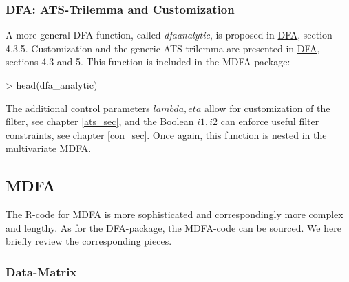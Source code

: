 \documentclass[a4paper]{book}
\begin{document}
\subsubsection{DFA: ATS-Trilemma and Customization}

A more general DFA-function, called \emph{dfa\textunderscore analytic}, is proposed in \href{http://blog.zhaw.ch/sef/files/2014/10/DFA.pdf}{DFA}, section 4.3.5. Customization and the generic ATS-trilemma are presented in \href{http://blog.zhaw.ch/sef/files/2014/10/DFA.pdf}{DFA}, sections 4.3 and 5. This function is included in the MDFA-package: 
\begin{Schunk}
\begin{Sinput}
> head(dfa_analytic)
\end{Sinput}
\begin{Soutput}
1 function (L, lambda, periodogram, Lag, Gamma, eta, cutoff, i1, 
2     i2)                                                        
3 {                                                              
4     lambda <- abs(lambda)                                      
5     eta <- abs(eta)                                            
6     K <- length(periodogram) - 1                               
\end{Soutput}
\end{Schunk}
The additional control parameters $lambda,eta$ allow for customization of the filter, see chapter \ref{ats_sec}, and the Boolean $i1,i2$ can enforce useful filter constraints, see chapter \ref{con_sec}. Once again, this function is nested in the multivariate MDFA. 



\subsection{MDFA}\label{mdfa_intro}

The R-code for MDFA is more sophisticated and correspondingly more complex and lengthy. As for the DFA-package, the MDFA-code can be sourced. We here briefly review the corresponding pieces.


\subsubsection{Data-Matrix}
\end{document}
